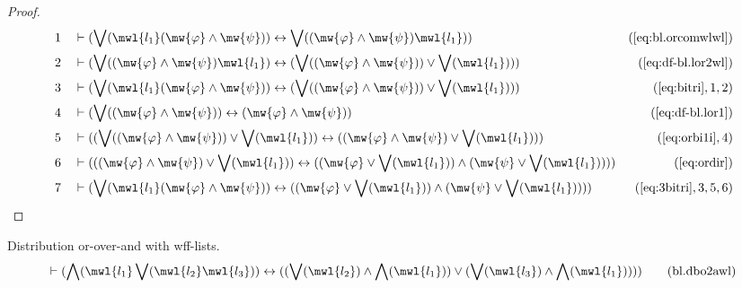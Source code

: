 \begin{proof}
\begin{align}
  1 &&  & \vdash ( \bigvee( \mwl{l_1} ( \mw{\varphi} \wedge \mw{\psi} ) ) \leftrightarrow \bigvee( ( \mw{\varphi} \wedge \mw{\psi} ) \mwl{l_1} ) )&(\mbox{\ref{eq:bl.orcomwlwl}})\notag
  \\ 2 &&  & \vdash ( \bigvee( ( \mw{\varphi} \wedge \mw{\psi} ) \mwl{l_1} ) \leftrightarrow ( \bigvee( ( \mw{\varphi} \wedge \mw{\psi} ) ) \vee \bigvee( \mwl{l_1} ) ) )&(\mbox{\ref{eq:df-bl.lor2wl}})\notag
  \\ 3 &&  & \vdash ( \bigvee( \mwl{l_1} ( \mw{\varphi} \wedge \mw{\psi} ) ) \leftrightarrow ( \bigvee( ( \mw{\varphi} \wedge \mw{\psi} ) ) \vee \bigvee( \mwl{l_1} ) ) )&(\mbox{\ref{eq:bitri}},1,2)\notag
  \\ 4 &&  & \vdash ( \bigvee( ( \mw{\varphi} \wedge \mw{\psi} ) ) \leftrightarrow ( \mw{\varphi} \wedge \mw{\psi} ) )&(\mbox{\ref{eq:df-bl.lor1}})\notag
  \\ 5 &&  & \vdash ( ( \bigvee( ( \mw{\varphi} \wedge \mw{\psi} ) ) \vee \bigvee( \mwl{l_1} ) ) \leftrightarrow ( ( \mw{\varphi} \wedge \mw{\psi} ) \vee \bigvee( \mwl{l_1} ) ) )&(\mbox{\ref{eq:orbi1i}},4)\notag
  \\ 6 &&  & \vdash ( ( ( \mw{\varphi} \wedge \mw{\psi} ) \vee \bigvee( \mwl{l_1} ) ) \leftrightarrow ( ( \mw{\varphi} \vee \bigvee( \mwl{l_1} ) ) \wedge ( \mw{\psi} \vee \bigvee( \mwl{l_1} ) ) ) )&(\mbox{\ref{eq:ordir}})\notag
  \\ 7 &&  & \vdash ( \bigvee( \mwl{l_1} ( \mw{\varphi} \wedge \mw{\psi} ) ) \leftrightarrow ( ( \mw{\varphi} \vee \bigvee( \mwl{l_1} ) ) \wedge ( \mw{\psi} \vee \bigvee( \mwl{l_1} ) ) ) )&(\mbox{\ref{eq:3bitri}},3,5,6)\notag
\end{align}
\end{proof}

\begin{lemma} Distribution or-over-and with wff-lists.
\begin{align}
\vdash ( \bigwedge( \mwl{l_1} \bigvee( \mwl{l_2} \mwl{l_3} ) ) \leftrightarrow
    ( ( \bigvee( \mwl{l_2} ) \wedge \bigwedge( \mwl{l_1} ) ) \vee ( \bigvee(
    \mwl{l_3} ) \wedge \bigwedge( \mwl{l_1} ) ) )
    )\label{eq:bl.dbo2awl}\tag{bl.dbo2awl}
\end{align}
\end{lemma}

